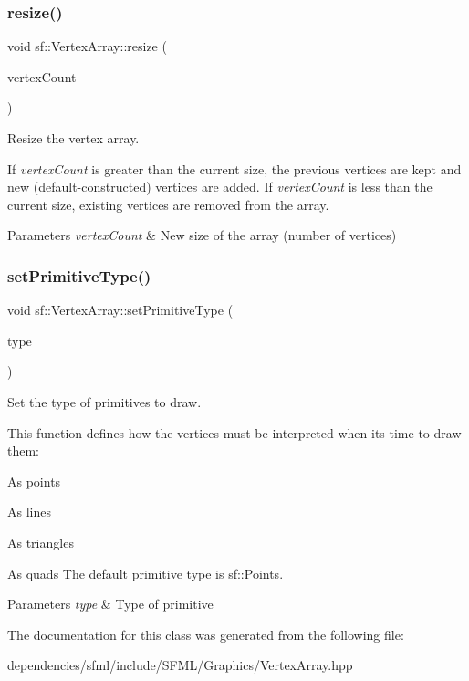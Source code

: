 \subsubsection{\texorpdfstring{resize()}{resize()}}
{\footnotesize\ttfamily void sf\+::\+Vertex\+Array\+::resize (\begin{DoxyParamCaption}\item[{std\+::size\+\_\+t}]{vertex\+Count }\end{DoxyParamCaption})}



Resize the vertex array. 

If {\itshape vertex\+Count} is greater than the current size, the previous vertices are kept and new (default-\/constructed) vertices are added. If {\itshape vertex\+Count} is less than the current size, existing vertices are removed from the array.


\begin{DoxyParams}{Parameters}
{\em vertex\+Count} & New size of the array (number of vertices) \\
\hline
\end{DoxyParams}
\mbox{\label{classsf_1_1_vertex_array_aa38c10707c28a97f4627ae8b2f3ad969}} 
\subsubsection{\texorpdfstring{set\+Primitive\+Type()}{setPrimitiveType()}}
{\footnotesize\ttfamily void sf\+::\+Vertex\+Array\+::set\+Primitive\+Type (\begin{DoxyParamCaption}\item[{\hyperlink{group__graphics_ga5ee56ac1339984909610713096283b1b}{Primitive\+Type}}]{type }\end{DoxyParamCaption})}



Set the type of primitives to draw. 

This function defines how the vertices must be interpreted when it\textquotesingle{}s time to draw them\+: \begin{DoxyItemize}
\item As points \item As lines \item As triangles \item As quads The default primitive type is sf\+::\+Points.\end{DoxyItemize}

\begin{DoxyParams}{Parameters}
{\em type} & Type of primitive \\
\hline
\end{DoxyParams}


The documentation for this class was generated from the following file\+:\begin{DoxyCompactItemize}
\item 
dependencies/sfml/include/\+S\+F\+M\+L/\+Graphics/Vertex\+Array.\+hpp\end{DoxyCompactItemize}
